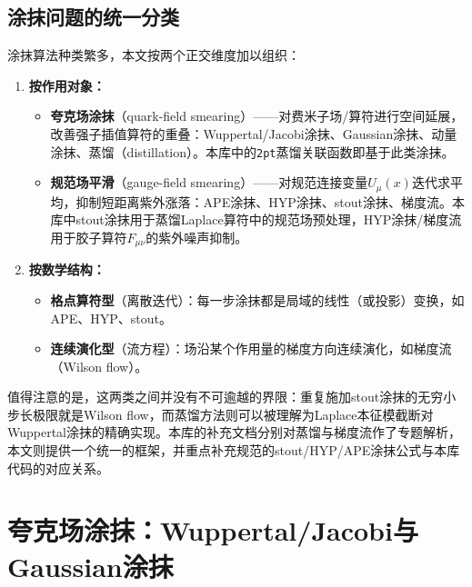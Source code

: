 \documentclass[12pt,a4paper]{ctexart}
\theoremstyle{definition}
\begin{document}
\subsection{涂抹问题的统一分类}

涂抹算法种类繁多，本文按两个正交维度加以组织：

\begin{enumerate}
    \item \textbf{按作用对象：}
    \begin{itemize}
        \item \textbf{夸克场涂抹}（quark-field smearing）——对费米子场/算符进行空间延展，改善强子插值算符的重叠：Wuppertal/Jacobi涂抹、Gaussian涂抹、动量涂抹、蒸馏（distillation）。本库中的\texttt{2pt}蒸馏关联函数即基于此类涂抹\cite{Egerer2021a,Chen2025gluon}。
        \item \textbf{规范场平滑}（gauge-field smearing）——对规范连接变量$U_\mu(x)$迭代求平均，抑制短距离紫外涨落：APE涂抹、HYP涂抹、stout涂抹、梯度流。本库中stout涂抹用于蒸馏Laplace算符中的规范场预处理，HYP涂抹/梯度流用于胶子算符$F_{\mu\nu}$的紫外噪声抑制\cite{Chen2025gluon,NoteGluonPDFs}。
    \end{itemize}
    \item \textbf{按数学结构：}
    \begin{itemize}
        \item \textbf{格点算符型}（离散迭代）：每一步涂抹都是局域的线性（或投影）变换，如APE、HYP、stout。
        \item \textbf{连续演化型}（流方程）：场沿某个作用量的梯度方向连续演化，如梯度流（Wilson flow）\cite{Luscher2010,LuscherWeisz2011}。
    \end{itemize}
\end{enumerate}

值得注意的是，这两类之间并没有不可逾越的界限：重复施加stout涂抹的无穷小步长极限就是Wilson flow\cite{Luscher2010}，而蒸馏方法则可以被理解为Laplace本征模截断对Wuppertal涂抹的精确实现\cite{Peardon2009}。本库的补充文档\cite{GradientFlowDoc,DistillationDoc}分别对蒸馏与梯度流作了专题解析，本文则提供一个统一的框架，并重点补充规范的stout/HYP/APE涂抹公式与本库代码的对应关系。

\section{夸克场涂抹：Wuppertal/Jacobi与Gaussian涂抹}
\end{document}
